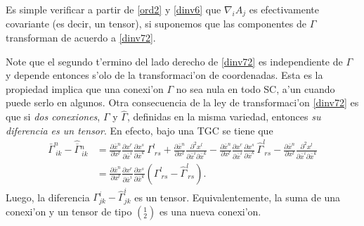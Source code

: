 Es simple verificar a partir de \eqref{ord2} y \eqref{dinv6} que $\nabla_iA_j$ es efectivamente covariante (es decir, un tensor), si suponemos que las componentes de $\Gamma$ transforman de acuerdo a \eqref{dinv72}.

Note que el segundo t'ermino del lado derecho de \eqref{dinv72} es independiente de $\Gamma$ y depende entonces s'olo de la transformaci'on de coordenadas. Esta es la propiedad implica que una conexi'on $\Gamma$ no sea nula en todo SC, a'un cuando puede serlo en algunos. Otra consecuencia de la ley de transformaci'on \eqref{dinv72} es que si \textit{dos conexiones}, $\Gamma$ y $\hat{\Gamma}$, definidas en la misma variedad, entonces \textit{su diferencia es un tensor}. En efecto, bajo una TGC se tiene que
\begin{align}
\bar\Gamma_{\ ik}^n-\hat{\overline{\Gamma}}{}^n_{\ ik} & =\frac{\partial
\bar{x}^n}{\partial x^l }\frac{\partial x^r}{\partial\bar{x}^i }
\frac{\partial x^s}{\partial\bar{x}^k }\,\Gamma_{\ rs}^l +\frac{\partial
\bar{x}^n}{\partial x^l }\frac{\partial^2 x^l }{\partial\bar{x}^i \partial\bar{x}^k }-\frac{\partial\bar{x}^n}{\partial x^l }
\frac{\partial x^r}{\partial\bar{x}^i }\frac{\partial x^s}{\partial
\bar{x}^k }\,\hat{\Gamma}_{\ rs}^l -\frac{\partial\bar{x}^n}{\partial x^l}\frac{\partial^2 x^l }{\partial\bar{x}^i \partial\bar{x}^k}\label{dinv8}\\
& =\frac{\partial
\bar{x}^n}{\partial x^l }\frac{\partial x^r}{\partial\bar{x}^i }
\frac{\partial x^s}{\partial\bar{x}^k }\left( \Gamma_{\ rs}^l
-\hat{\Gamma}_{\ rs}^l \right) .\nonumber
\end{align}
Luego, la diferencia $\Gamma_{jk}^i -\hat{\Gamma}_{jk}^i $ es un tensor. Equivalentemente, la suma de una conexi'on y un tensor de tipo $(_2^1)$ es una nueva conexi'on.

